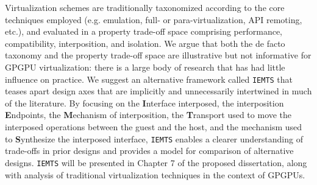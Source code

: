 Virtualization schemes are traditionally taxonomized according to the core
techniques employed (e.g. emulation, full- or para-virtualization, API
remoting, etc.), and evaluated in a property trade-off space comprising
performance, compatibility, interposition, and isolation. We argue that both
the de facto taxonomy and the property trade-off space are illustrative but
not informative for GPGPU virtualization: there is a large body of research
that has had little influence on practice. We suggest an alternative framework
called \texttt{IEMTS} that teases apart design axes that are implicitly and
unnecessarily intertwined in much of the literature. By focusing on the
\textbf{I}nterface interposed, the interposition \textbf{E}ndpoints, the
\textbf{M}echanism of interposition, the \textbf{T}ransport used to move the
interposed operations between the guest and the host, and the mechanism used
to \textbf{S}ynthesize the interposed interface, \texttt{IEMTS} enables a
clearer understanding of trade-offs in prior designs and provides a model for
comparison of alternative designs. \texttt{IEMTS} will be presented in Chapter
7 of the proposed dissertation, along with analysis of traditional
virtualization techniques in the context of GPGPUs.